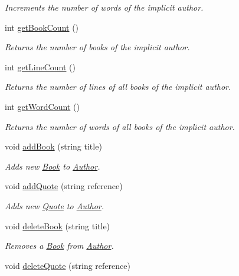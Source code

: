 \begin{DoxyCompactItemize}
\begin{DoxyCompactList}\small\item\em Increments the number of words of the implicit author. \end{DoxyCompactList}\item 
int \hyperlink{class_author_aced7597c300bb102982bac734fb8f6f9}{get\+Book\+Count} ()
\begin{DoxyCompactList}\small\item\em Returns the number of books of the implicit author. \end{DoxyCompactList}\item 
int \hyperlink{class_author_acdd7230d9c634ae6af00ab24ec50c75f}{get\+Line\+Count} ()
\begin{DoxyCompactList}\small\item\em Returns the number of lines of all books of the implicit author. \end{DoxyCompactList}\item 
int \hyperlink{class_author_a7f9c980db86b65b79624c4df671c1001}{get\+Word\+Count} ()
\begin{DoxyCompactList}\small\item\em Returns the number of words of all books of the implicit author. \end{DoxyCompactList}\item 
void \hyperlink{class_author_a5836c0e00e740d4e9e9049e94f032cc3}{add\+Book} (string title)
\begin{DoxyCompactList}\small\item\em Adds new \hyperlink{class_book}{Book} to \hyperlink{class_author}{Author}. \end{DoxyCompactList}\item 
void \hyperlink{class_author_a8605dbbab320ca251f3c64e782cf40b3}{add\+Quote} (string reference)
\begin{DoxyCompactList}\small\item\em Adds new \hyperlink{class_quote}{Quote} to \hyperlink{class_author}{Author}. \end{DoxyCompactList}\item 
void \hyperlink{class_author_ad48c2d5ae47d521bf5d4aa638bb86976}{delete\+Book} (string title)
\begin{DoxyCompactList}\small\item\em Removes a \hyperlink{class_book}{Book} from \hyperlink{class_author}{Author}. \end{DoxyCompactList}\item 
void \hyperlink{class_author_a41078931f76f02641f92521a3da5b286}{delete\+Quote} (string reference)

\end{DoxyCompactItemize}
